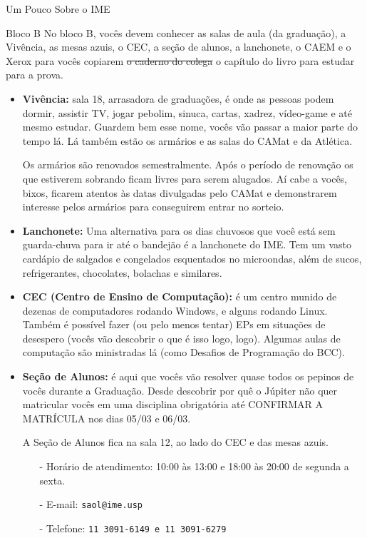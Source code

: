\begin{secao}{Um Pouco Sobre o IME}
\begin{subsecao}{Bloco B}
No bloco B, vocês devem conhecer as salas de aula (da graduação), a Vivência, as
mesas azuis, o CEC, a seção de alunos, a lanchonete, o CAEM e o Xerox para vocês
copiarem \sout{o caderno do colega} o capítulo do livro para estudar para a prova.

\begin{itemize}
\item {\bf Vivência:} sala 18, arrasadora de graduações, é onde as pessoas podem
dormir, assistir TV, jogar pebolim, sinuca, cartas, xadrez, vídeo-game e até
mesmo estudar. Guardem bem esse nome, vocês vão passar a maior parte do tempo lá.
Lá também estão os armários e as salas do CAMat e da Atlética.

Os armários são renovados semestralmente. Após o período de renovação os que
estiverem sobrando ficam livres para serem alugados. Aí cabe a vocês, bixos, ficarem
atentos às datas divulgadas pelo CAMat e demonstrarem interesse pelos armários para
conseguirem entrar no sorteio.

\item {\bf Lanchonete:} Uma alternativa para os dias chuvosos que você está sem
  guarda-chuva para ir até o bandejão é a lanchonete do IME. Tem um vasto
  cardápio de salgados e congelados esquentados no microondas, além de sucos,
  refrigerantes, chocolates, bolachas e similares.

\item {\bf CEC (Centro de Ensino de Computação):} é um centro munido de dezenas
de computadores rodando Windows, e alguns rodando Linux. Também é possível fazer
(ou pelo menos tentar) EPs em situações de desespero (vocês vão descobrir o que é
isso logo, logo). Algumas aulas de computação são ministradas lá (como Desafios
de Programação do BCC).

\item {\bf Seção de Alunos:} é aqui que vocês vão resolver quase todos os
pepinos de vocês durante a Graduação. Desde descobrir por quê o Júpiter não
quer matricular vocês em uma disciplina obrigatória até CONFIRMAR A MATRÍCULA
nos dias 05/03 e 06/03. %

A Seção de Alunos fica na sala 12, ao lado do CEC e das mesas azuis.
\begin{itemize}
\item[-] Horário de atendimento: 10:00 às 13:00 e 18:00 às 20:00 de segunda a sexta.
\item[-] E-mail: \tt{saol@ime.usp}
\item[-] Telefone: \tt{11 3091-6149} e \tt{11 3091-6279}
\end{itemize}


\end{itemize}
\end{subsecao}
\end{secao}
